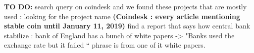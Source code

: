 \begin{itemize}
\textbf{TO DO:}
search query on coindesk and we found these projects that are mostly used : looking for the project name \textbf{(Coindesk : every article mentioning stable coin until January 11, 2019)}
find a report that says how central bank stabilize : bank of England has a bunch of white papers -> "Banks used the exchange rate but it failed “ phrase is from one of it white papers.

\end{itemize}


